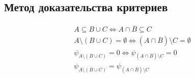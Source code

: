 \documentclass{article}
\begin{document}
\subsection{Метод доказательства критериев}

\begin{gather*}
	A \subseteq B \cup C \Leftrightarrow A \cap \overline{B} \subseteq C \\
	A \setminus (B \cup C) = \emptyset \Leftrightarrow (A \cap \overline{B}) \setminus C = \emptyset \\
	\psi_{A \setminus (B \cup C)} = 0 \Leftrightarrow \psi_{(A \cap \overline{B}) \setminus C} = 0 \\
	\psi_{A \setminus (B \cup C)} = \psi_{(A \cap \overline{B}) \setminus C}
\end{gather*}	
\end{document}
